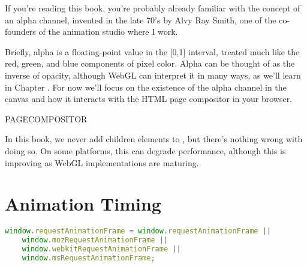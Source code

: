 If you're reading this book, you're probably already familiar with the concept of an alpha channel, invented in the late 70's by Alvy Ray Smith, one of the co-founders of the animation studio where I work.

Briefly, alpha is a floating-point value in the [0,1] interval, treated much like the red, green, and blue components of pixel color.  Alpha can be thought of as the inverse of opacity, although WebGL can interpret it in many ways, as we'll learn in Chapter .  For now we'll focus on the existence of the alpha channel in the canvas and how it interacts with the HTML page compositor in your browser.

PAGECOMPOSITOR

\begin{comment}
images of a web page that has a background image (Egypt!)
each canvas should have an opaque perspective cube

0,0.25,.5,.5 -- no alpha, css-opacity=1
0,0.25,.5,.5 -- alpha without premultiplied, css-opacity=1
0,0.25,.5,.5 -- alpha with premultiplied, css-opacity=1

0,0.25,.5,.5 -- no alpha, css-opacity=.5
0,0.25,.5,.5 -- alpha without premultiplied, css-opacity=.5
0,0.25,.5,.5 -- alpha with premultiplied, css-opacity=.5
\end{comment}

\begin{sidenote}
In this book, we never add children elements to , but there's nothing wrong with doing so.  On some platforms, this can degrade performance, although this is improving as WebGL implementations are maturing.
\end{sidenote}

\section{Animation Timing}

\begin{lstlisting}[language=JavaScript]
  window.requestAnimationFrame = window.requestAnimationFrame ||
    window.mozRequestAnimationFrame ||
    window.webkitRequestAnimationFrame ||
    window.msRequestAnimationFrame;
\end{lstlisting}


